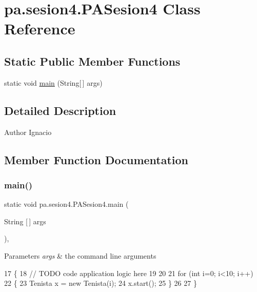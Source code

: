 \hypertarget{classpa_1_1sesion4_1_1_p_a_sesion4}{}\section{pa.\+sesion4.\+P\+A\+Sesion4 Class Reference}
\label{classpa_1_1sesion4_1_1_p_a_sesion4}
\subsection*{Static Public Member Functions}
\begin{DoxyCompactItemize}
\item 
static void \mbox{\hyperlink{classpa_1_1sesion4_1_1_p_a_sesion4_a153ea65090d8cee3a1d988faec45e776}{main}} (String\mbox{[}$\,$\mbox{]} args)
\end{DoxyCompactItemize}


\subsection{Detailed Description}
\begin{DoxyAuthor}{Author}
Ignacio 
\end{DoxyAuthor}


\subsection{Member Function Documentation}
\mbox{\label{classpa_1_1sesion4_1_1_p_a_sesion4_a153ea65090d8cee3a1d988faec45e776}} 
\subsubsection{\texorpdfstring{main()}{main()}}
{\footnotesize\ttfamily static void pa.\+sesion4.\+P\+A\+Sesion4.\+main (\begin{DoxyParamCaption}\item[{String \mbox{[}$\,$\mbox{]}}]{args }\end{DoxyParamCaption})\hspace{0.3cm}{\ttfamily [inline]}, {\ttfamily [static]}}


\begin{DoxyParams}{Parameters}
{\em args} & the command line arguments \\
\hline
\end{DoxyParams}

\begin{DoxyCode}
17                                            \{
18         \textcolor{comment}{// TODO code application logic here}
19         
20         
21         \textcolor{keywordflow}{for} (\textcolor{keywordtype}{int} i=0; i<10; i++)
22         \{
23             Tenista x = \textcolor{keyword}{new} Tenista(i);
24             x.start();
25         \}
26         
27     \}
\end{DoxyCode}
